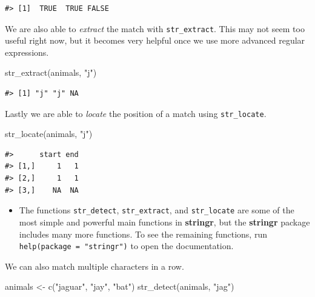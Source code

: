 \documentclass[
]{krantz}
\makeatletter
\newenvironment{Shaded}{\begin{snugshade}}{\end{snugshade}}
\newcommand{\FunctionTok}[1]{\textcolor[rgb]{0.00,0.00,0.00}{#1}}
\newcommand{\NormalTok}[1]{#1}
\newcommand{\OtherTok}[1]{\textcolor[rgb]{0.56,0.35,0.01}{#1}}
\newcommand{\StringTok}[1]{\textcolor[rgb]{0.31,0.60,0.02}{#1}}
\newenvironment{kframe}{%
\medskip{}
\setlength{\fboxsep}{.8em}
 \def\at@end@of@kframe{}%
 \ifinner\ifhmode%
  \def\at@end@of@kframe{\end{minipage}}%
  \begin{minipage}{\columnwidth}%
 \fi\fi%
 \def\FrameCommand##1{\hskip\@totalleftmargin \hskip-\fboxsep
 \colorbox{shadecolor}{##1}\hskip-\fboxsep
     \hskip-\linewidth \hskip-\@totalleftmargin \hskip\columnwidth}%
 \MakeFramed {\advance\hsize-\width
   \@totalleftmargin\z@ \linewidth\hsize
   \@setminipage}}%
 {\par\unskip\endMakeFramed%
 \at@end@of@kframe}
\renewenvironment{Shaded}{\begin{kframe}}{\end{kframe}}
\newenvironment{rmdblock}[1]
  {\begin{shaded*}
  \begin{itemize}[left = -1cm, labelsep = 1cm]
  \renewcommand{\labelitemi}{
    \raisebox{-.7\height}[0pt][0pt]{
      {\setkeys{Gin}{width=3em,keepaspectratio}\texttt{[image: images/\#1]}}
    }
  }
 
  \item
  }
  {
  \end{itemize}
  \end{shaded*}
  }
\newenvironment{rmdnote}
  {\begin{rmdblock}{note}}
  {\end{rmdblock}}
\makeatother
\begin{document}
\begin{verbatim}
#> [1]  TRUE  TRUE FALSE
\end{verbatim}

We are also able to \emph{extract} the match with \texttt{str\_extract}. This may not seem too useful right now, but it becomes very helpful once we use more advanced regular expressions.

\begin{Shaded}
\begin{Highlighting}[]
\FunctionTok{str\_extract}\NormalTok{(animals, }\StringTok{"j"}\NormalTok{)}
\end{Highlighting}
\end{Shaded}

\begin{verbatim}
#> [1] "j" "j" NA
\end{verbatim}

Lastly we are able to \emph{locate} the position of a match using \texttt{str\_locate}.

\begin{Shaded}
\begin{Highlighting}[]
\FunctionTok{str\_locate}\NormalTok{(animals, }\StringTok{"j"}\NormalTok{)}
\end{Highlighting}
\end{Shaded}

\begin{verbatim}
#>      start end
#> [1,]     1   1
#> [2,]     1   1
#> [3,]    NA  NA
\end{verbatim}

\begin{rmdnote}
The functions \texttt{str\_detect}, \texttt{str\_extract}, and
\texttt{str\_locate} are some of the most simple and powerful main
functions in \textbf{stringr}, but the \textbf{stringr} package includes
many more functions. To see the remaining functions, run
\texttt{help(package\ =\ "stringr")} to open the documentation.
\end{rmdnote}

We can also match multiple characters in a row.

\begin{Shaded}
\begin{Highlighting}[]
\NormalTok{animals }\OtherTok{\textless{}{-}} \FunctionTok{c}\NormalTok{(}\StringTok{"jaguar"}\NormalTok{, }\StringTok{"jay"}\NormalTok{, }\StringTok{"bat"}\NormalTok{)}
\FunctionTok{str\_detect}\NormalTok{(animals, }\StringTok{"jag"}\NormalTok{)}
\end{Highlighting}
\end{Shaded}
\end{document}
